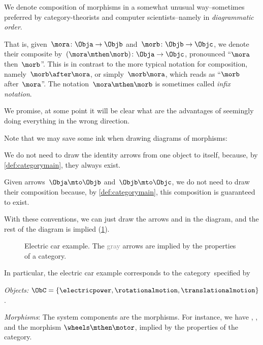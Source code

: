 \begin{remark}
  We denote composition of morphisms in a somewhat unusual way--sometimes preferred by category-theorists and computer scientists--namely in \emph{diagrammatic order}.

  That is, given~$\mora \colon \Obja\to \Objb$ and~$\morb \colon \Objb \to \Objc$, we denote their composite by~$(\mora\mthen \morb)\colon \Obja\to \Objc$, pronounced ``$\mora$ then~$\morb$''. This is in contrast to the more typical notation for composition, namely~$\morb\after \mora$, or simply~$\morb \mora$, which reads as ``$\morb$ after~$\mora$''. The notation~$\mora \mthen \morb$ is sometimes called \emph{infix notation}.

  We promise, at some point it will be clear what are the advantages of seemingly doing everything
  in the wrong direction.
\end{remark}

Note that we may save some ink when drawing diagrams of morphisms:
\begin{compactitem}
  \item We do not need to draw the identity arrows from one object to itself, because, by \cref{def:categorymain}, they always exist.
  \item  Given arrows~$\Obja \mto \Objb$ and~$\Objb \mto \Objc$, we do not need to draw their composition because, by \cref{def:categorymain}, this composition is guaranteed to exist.
\end{compactitem}

With these conventions, we can just draw the arrows \motor and \wheels in the diagram, and the rest of the diagram is implied (\cref{fig:e5}).

\begin{figure}[h!]
  \centering
  \caption{
    Electric car example.
    The \textcolor{gray}{gray} arrows are implied by the properties
    of a category.
  }
  \label{fig:e5}
\end{figure}

In particular, the electric car example corresponds to the category~\CatC specified by
\begin{compactitem}
  \item \emph{Objects:} $\ObC=\{ \electricpower,\rotationalmotion,\translationalmotion\}$.
  \item \emph{Morphisms}: The system components are the morphisms. For instance, we have \motor, \wheels, and the morphism $\wheels \mthen \motor$, implied by the properties of the category.
\end{compactitem}

